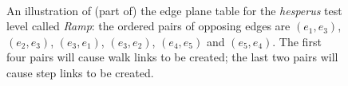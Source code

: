 \documentclass[10pt,twocolumn]{article}
\newenvironment{stusubfig}[1]
{
	\begin{figure}[#1]
	\begin{center}
}
{
	\end{center}
	\end{figure}
}
\begin{document}
\begin{stusubfig}{!t}
	\hspace{4mm}%
	\\
\caption{An illustration of (part of) the edge plane table for the \emph{hesperus} test level called \emph{Ramp}: the ordered pairs of opposing edges are $(e_1,e_3)$, $(e_2,e_3)$, $(e_3,e_1)$, $(e_3,e_2)$, $(e_4,e_5)$ and $(e_5,e_4)$. The first four pairs will cause walk links to be created; the last two pairs will cause step links to be created.}
\label{fig:edgeplanetable}
\end{stusubfig}
\end{document}

